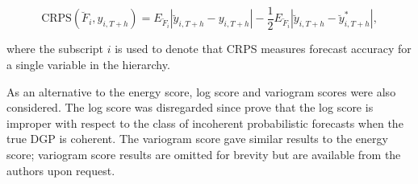 \documentclass[graybox]{svmult}
\begin{document}
\begin{equation*}
\text{CRPS}(\breve{F}_i,y_{i,T+h}) = E_{\breve{F}_i}|\breve{y}_{i,T+h}-y_{i,T+h}| - \frac{1}{2}E_{\breve{F}_i}|\breve{y}_{i,T+h}-\breve{y}^*_{i,T+h}|,
\end{equation*}

where the subscript $i$ is used to denote that CRPS measures forecast accuracy for a single variable in the hierarchy.

As an alternative to the energy score, log score and variogram scores were also considered.  The log score was disregarded since \cite{GamEtAl2018} prove that the log score is improper with respect to the class of incoherent probabilistic forecasts when the true DGP is coherent.  {\color{orange}The variogram score gave similar results to the energy score; variogram score results are omitted for brevity but are available from the authors upon request.}


%
%
%
%
%
%
%
\end{document}
